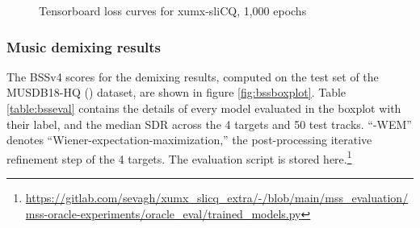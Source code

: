 \documentclass[report.tex]{subfiles}
\begin{document}
\begin{figure}[ht]
	\centering
	\hspace{0.5em}
	\caption{Tensorboard loss curves for xumx-sliCQ, 1,000 epochs}
	\label{fig:networkloss}
\end{figure}

\newpagefill

\subsubsection{Music demixing results}
\label{sec:demixresults}

The BSSv4 scores for the demixing results, computed on the test set of the MUSDB18-HQ (\cite{musdb18hq}) dataset, are shown in figure \ref{fig:bssboxplot}. Table \ref{table:bsseval} contains the details of every model evaluated in the boxplot with their label, and the median SDR across the 4 targets and 50 test tracks. ``-WEM'' denotes ``Wiener-expectation-maximization,'' the post-processing iterative refinement step of the 4 targets. The evaluation script is stored here.\footnote{\url{https://gitlab.com/sevagh/xumx_slicq_extra/-/blob/main/mss_evaluation/mss-oracle-experiments/oracle_eval/trained_models.py}}
\end{document}
